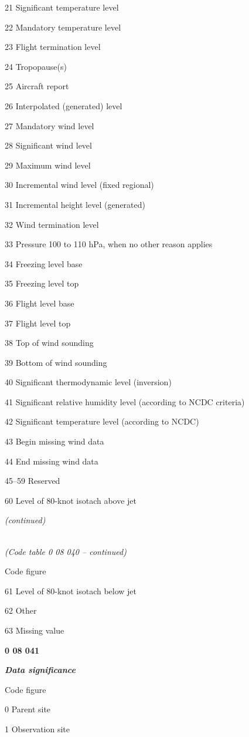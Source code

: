 21 Significant temperature level

22 Mandatory temperature level

23 Flight termination level

24 Tropopause(s)

25 Aircraft report

26 Interpolated (generated) level

27 Mandatory wind level

28 Significant wind level

29 Maximum wind level

30 Incremental wind level (fixed regional)

31 Incremental height level (generated)

32 Wind termination level

33 Pressure 100 to 110 hPa, when no other reason applies

34 Freezing level base

35 Freezing level top

36 Flight level base

37 Flight level top

38 Top of wind sounding

39 Bottom of wind sounding

40 Significant thermodynamic level (inversion)

41 Significant relative humidity level (according to NCDC criteria)

42 Significant temperature level (according to NCDC)

43 Begin missing wind data

44 End missing wind data

45--59 Reserved

60 Level of 80-knot isotach above jet

\emph{(continued)}

\emph{\\
(Code table 0 08 040 -- continued)}

Code figure

61 Level of 80-knot isotach below jet

62 Other

63 Missing value

\textbf{0 08 041}

\emph{\textbf{Data significance}}

Code figure

0 Parent site

1 Observation site

